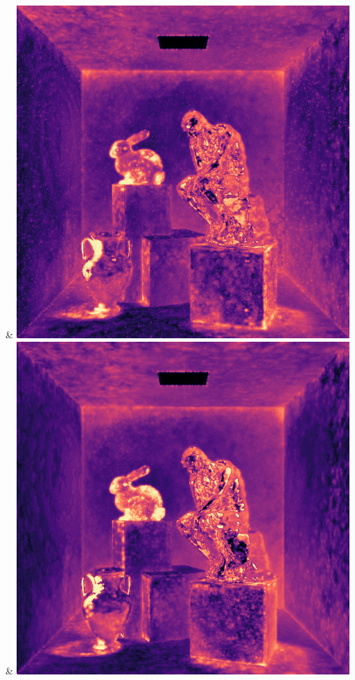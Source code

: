 & \includegraphics[width=\linewidth]{figures/py/tests/path_termination/bthk9_1spp_thinker_flip.png}
& \includegraphics[width=\linewidth]{figures/py/tests/path_termination/1stdiff_1spp_thinker_flip.png}
